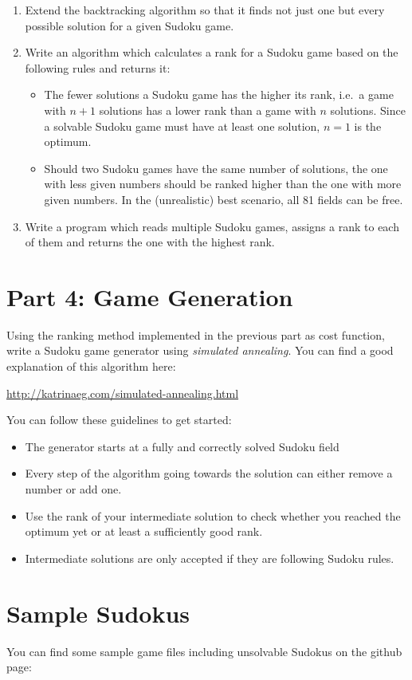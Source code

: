 \documentclass{article}
\begin{document}
    \begin{enumerate}
        \item Extend the backtracking algorithm so that it finds not just one but every
            possible solution for a given Sudoku game.
        \item Write an algorithm which calculates a rank for a Sudoku game based on the
            following rules and returns it:
            \begin{itemize}
                \item The fewer solutions a Sudoku game has the higher its rank, i.e.\ a game
                    with $n + 1$ solutions has a lower rank than a game with $n$ solutions.
                    Since a solvable Sudoku game must have at least one solution, $n=1$ is the
                    optimum.
                \item Should two Sudoku games have the same number of solutions, the one with 
                    less given numbers should be ranked higher than the one with more
                    given numbers. In the (unrealistic) best scenario, all 81 fields can be free.
            \end{itemize}
        \item Write a program which reads multiple Sudoku games, assigns a rank to each of them
            and returns the one with the highest rank.
    \end{enumerate}
    
    \section{Part 4: Game Generation}

    Using the ranking method implemented in the previous part as cost function, write a 
    Sudoku game generator using \textit{simulated annealing}. You can find a good explanation
    of this algorithm here:

    \url{http://katrinaeg.com/simulated-annealing.html}

    You can follow these guidelines to get started:
    \begin{itemize}
        \item The generator starts at a fully and correctly solved Sudoku field
        \item Every step of the algorithm going towards the solution can either remove
            a number or add one.
        \item Use the rank of your intermediate solution to check whether you reached the
            optimum yet or at least a sufficiently good rank.
        \item Intermediate solutions are only accepted if they are following Sudoku rules.
    \end{itemize}

    \section{Sample Sudokus}
    You can find some sample game files including unsolvable Sudokus on the github page:

    \url{}
\end{document}

